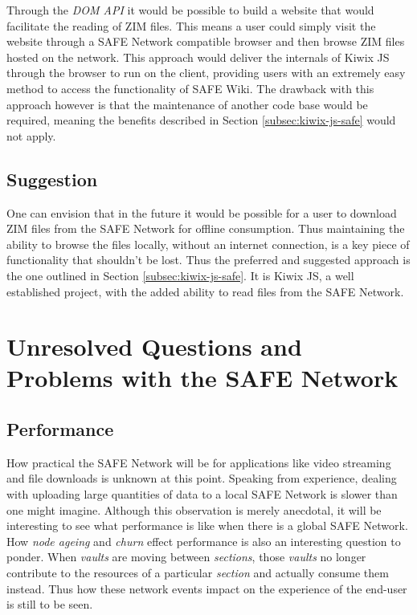 Through the \textit{DOM API} it would be possible to build a website that would facilitate the reading of ZIM files. This means a user could simply visit the website through a SAFE Network compatible browser and then browse ZIM files hosted on the network. This approach would deliver the internals of Kiwix JS through the browser to run on the client, providing users with an extremely easy method to access the functionality of SAFE Wiki. The drawback with this approach however is that the maintenance of another code base would be required, meaning the benefits described in Section \ref{subsec:kiwix-js-safe} would not apply.

\subsection{Suggestion}

One can envision that in the future it would be possible for a user to download ZIM files from the SAFE Network for offline consumption. Thus maintaining the ability to browse the files locally, without an internet connection, is a key piece of functionality that shouldn't be lost. Thus the preferred and suggested approach is the one outlined in Section \ref{subsec:kiwix-js-safe}. It is Kiwix JS, a well established project, with the added ability to read files from the SAFE Network.

\section{Unresolved Questions and Problems with the SAFE Network}

\subsection{Performance}
\label{subsec:problem-performance}

How practical the SAFE Network will be for applications like video streaming and file downloads is unknown at this point. Speaking from experience, dealing with uploading large quantities of data to a local SAFE Network is slower than one might imagine. Although this observation is merely anecdotal, it will be interesting to see what performance is like when there is a global SAFE Network. How \textit{node ageing} and \textit{churn} effect performance is also an interesting question to ponder. When \textit{vaults} are moving between \textit{sections}, those \textit{vaults} no longer contribute to the resources of a particular \textit{section} and actually consume them instead. Thus how these network events impact on the experience of the end-user is still to be seen.

